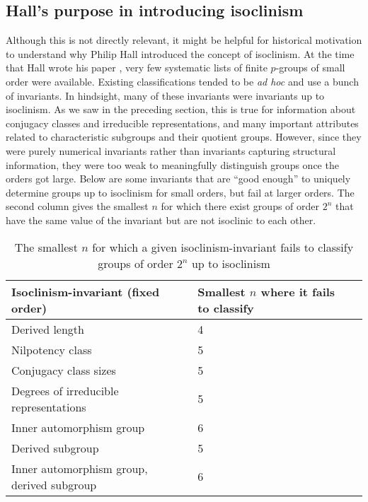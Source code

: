 \subsection{Hall's purpose in introducing isoclinism}

Although this is not directly relevant, it might be helpful for
historical motivation to understand why Philip Hall introduced the
concept of isoclinism. At the time that Hall wrote his paper
\cite{Hall37}, very few systematic lists of finite $p$-groups of small
order were available. Existing classifications tended to be {\em ad
  hoc} and use a bunch of invariants. In hindsight, many of these
invariants were invariants up to isoclinism. As we saw in the
preceding section, this is true for information about conjugacy
classes and irreducible representations, and many important attributes
related to characteristic subgroups and their quotient
groups. However, since they were purely numerical invariants rather
than invariants capturing structural information, they were too weak
to meaningfully distinguish groups once the orders got large. Below
are some invariants that are ``good enough'' to uniquely determine
groups up to isoclinism for small orders, but fail at larger
orders. The second column gives the smallest $n$ for which there exist
groups of order $2^n$ that have the same value of the invariant but
are not isoclinic to each other.

\vspace{0.3in}

\begin{small}
\begin{table}[htbp]
\caption{The smallest $n$ for which a given isoclinism-invariant fails to classify groups of order $2^n$ up to isoclinism}\label{T1}
\begin{tabular}{|l|l|l|}
  \hline
  Isoclinism-invariant (fixed order) & Smallest $n$ where it fails to classify \\\hline
  Derived length & 4 \\\hline
  Nilpotency class & 5 \\\hline
  Conjugacy class sizes & 5 \\\hline
  Degrees of irreducible representations & 5 \\\hline
  Inner automorphism group & 6 \\\hline
  Derived subgroup & 5 \\\hline
  Inner automorphism group, derived subgroup & 6 \\\hline
\end{tabular}
\end{table}
\end{small}

